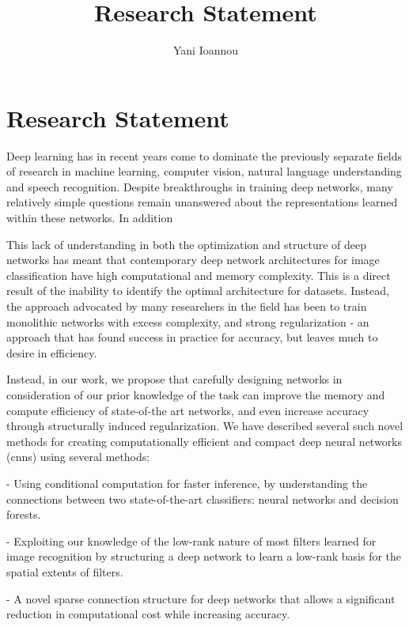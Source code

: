 \documentclass[]{article}
\title{Research Statement}
\author{Yani Ioannou}
\begin{document}
\maketitle



\section{Research Statement}
Deep learning has in recent years come to dominate the previously separate fields of research in machine learning, computer vision, natural language understanding and speech recognition. Despite breakthroughs in training deep networks, many relatively simple questions remain unanswered about the representations learned within these networks. In addition 

This lack of understanding in both the optimization and structure of deep networks has meant that contemporary deep network architectures for image classification have high computational and memory complexity. This is a direct result of the inability to identify the optimal architecture for datasets. Instead, the approach advocated by many researchers in the field has been to train monolithic networks with excess complexity, and strong regularization - an approach that has found success in practice for accuracy, but leaves much to desire in efficiency.

Instead, in our work, we propose that carefully designing networks in consideration of our prior knowledge of the task can improve the memory and compute efficiency of state-of-the art networks, and even increase accuracy through structurally induced regularization. We have described several such novel methods for creating computationally efficient and compact deep neural networks (\glspl{cnn}) using several methods:

- Using conditional computation for faster inference, by understanding the connections between two state-of-the-art classifiers: neural networks and decision forests.

- Exploiting our knowledge of the low-rank nature of most filters learned for image recognition by structuring a deep network to learn a low-rank basis for the spatial extents of filters.

- A novel sparse connection structure for deep networks that allows a significant reduction in computational cost while increasing accuracy.
\pagebreak
\end{document}
